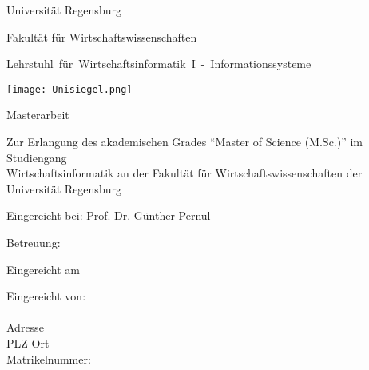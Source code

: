 %
%
%

\thispagestyle{empty}
\begin{titlepage}


\begin{adjustwidth}{-2cm}{}


\renewcommand{\thepage}{}

\begin{center}

\large{Universität Regensburg\\}

\large{Fakultät für Wirtschaftswissenschaften\\}

\large{\mbox{Lehrstuhl für Wirtschaftsinformatik I - Informationssysteme}}

\vspace*{5mm}

\Large{\textbf{\titelthema}}

\vspace*{5mm}
\texttt{[image: Unisiegel.png]}
\vspace*{4mm}

\Large{Masterarbeit}

\vspace*{5mm}


\end{center}
\begin{center}
Zur Erlangung des akademischen Grades "`Master of Science (M.Sc.)"' im Studiengang\\
Wirtschaftsinformatik an der Fakultät für Wirtschaftswissenschaften der\\
Universität Regensburg

\vspace*{5mm}

\Large{Eingereicht bei: Prof. Dr. Günther Pernul\\}

\Large{Betreuung: \betreuer\\}

\end{center}

\vfill

\begin{center}
\large{Eingereicht am \abgabedatum\\}
\end{center}
\vspace*{0.6cm}
\begin{flushleft}
Eingereicht von:\\
\vspace*{7pt}
\authorname\\
Adresse\\
PLZ Ort\\
Matrikelnummer: \matrikelnr\\




\end{flushleft}

\end{adjustwidth}

\end{titlepage}

\newpage

